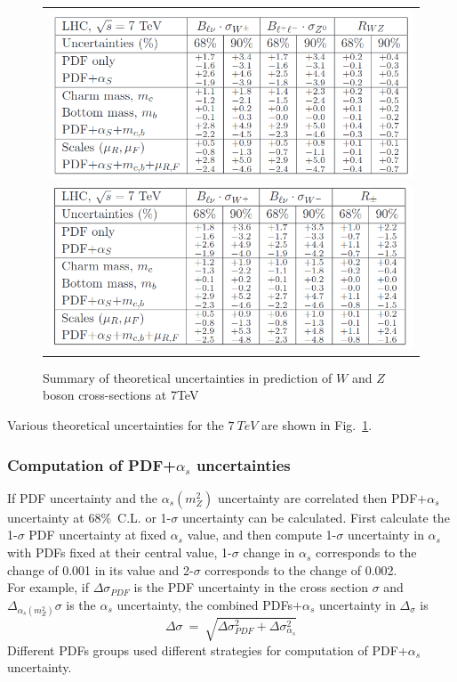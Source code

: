 \begin{figure}[h!]
\centering
\begin{tabular}{c}
\includegraphics[scale=0.5]{chapter3/uncertain1.png}\\
\includegraphics[scale=0.5]{chapter3/uncertain2.png}
\end{tabular}
\caption{Summary of theoretical uncertainties in prediction of $W$ and $Z$ boson cross-sections at 7TeV~\cite{Watt_2011}}
\vspace{2cm}
\label{uncertain}
\end{figure}
Various theoretical uncertainties for the $7~TeV$ are shown in Fig.~\ref{uncertain}.
\subsubsection{Computation of PDF+$\alpha_{s}$ uncertainties}
If PDF uncertainty and the $\alpha_{s}(m_{Z}^{2})$ uncertainty are correlated then PDF$+\alpha_{s}$ uncertainty at $68\%$~C.L. or 1-$\sigma$ uncertainty can be calculated. First calculate the 1-$\sigma$ PDF uncertainty at fixed $\alpha_{s}$ value, and then compute 1-$\sigma$ uncertainty in $\alpha_{s}$ with PDFs fixed at their central value, 1-$\sigma$ change in $\alpha_{s}$ corresponds to the change of 0.001 in its value and 2-$\sigma$ corresponds to the change of 0.002.\\
For example, if $\Delta\sigma_{PDF}$ is the PDF uncertainty in the cross section $\sigma$ and $\Delta_{\alpha_{s}(m_{Z}^{2})}\sigma$ is the $\alpha_{s}$ uncertainty, the combined PDFs$+\alpha_{s}$ uncertainty in $\Delta_{\sigma}$ is
\begin{equation}
\Delta\sigma~=~\sqrt{\Delta\sigma_{PDF}^{2}+\Delta\sigma_{\alpha_{s}}^{2}}
\end{equation}
Different PDFs groups used different strategies for computation of PDF+$\alpha_{s}$ uncertainty.
